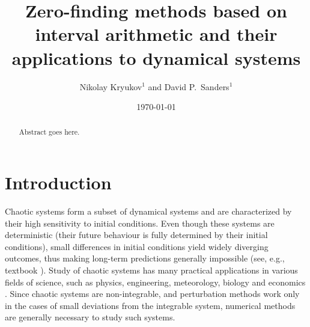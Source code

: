 \documentclass[pre, amsmath, amssymb, onecolumn, showpacs]{revtex4-1}
\begin{document}
\title{Zero-finding methods based on interval arithmetic and their applications to dynamical systems}

\author{Nikolay Kryukov$^{1}$ and David P.~Sanders$^{1}$}

\address{$^{1}$Departamento de F\'isica, Facultad de Ciencias, Universidad Nacional
Aut\'onoma de M\'exico,
Ciudad Universitaria, M\'exico D.F.\ 04510, Mexico
}

 \date{\today}


\begin{abstract}

Abstract goes here.

\end{abstract}

\maketitle


%

\section{Introduction}

Chaotic systems form a subset of dynamical systems and are characterized by their high sensitivity to initial conditions. Even though these systems are deterministic (their future behaviour is fully determined by their initial conditions), small differences in initial conditions yield widely diverging outcomes, thus making long-term predictions generally impossible (see, e.g., textbook \cite{goldstein}). Study of chaotic systems has many practical applications in various fields of science, such as physics, engineering, meteorology, biology and economics \cite{tsonis, shukla, weixing1993quasiperiodic, giuggioli2013encounter, fradkov2005control, kopel1997improving}. Since chaotic systems are non-integrable, and perturbation methods work only in the cases of small deviations from the integrable system, numerical methods are generally necessary to study such systems.
\end{document}
